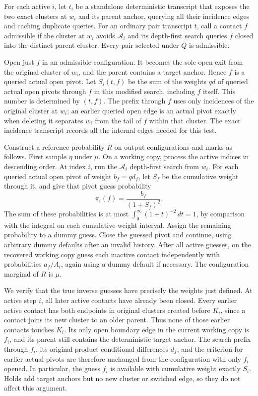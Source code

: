For each active $i$, let $t_i$ be a standalone deterministic transcript
that exposes the two exact clusters at $w_i$ and its parent anchor,
querying all their incidence edges and caching duplicate queries.
For an ordinary pair transcript $t$, call a contact $f$ admissible if
the cluster at $w_i$ avoids $\mathcal A_i$ and its depth-first search
queries $f$ closed into the distinct parent cluster. Every pair selected
under $Q$ is admissible.

Open just $f$ in an admissible configuration. It becomes the sole open
exit from the original cluster of $w_i$, and the parent contains a target
anchor. Hence $f$ is a queried actual open pivot. Let $S_i(t,f)$ be the
sum of the weights $qd$ of queried actual open pivots through $f$ in this
modified search, including $f$ itself. This number is determined by
$(t,f)$. The prefix through $f$ uses only incidences of the original
cluster at $w_i$; an earlier queried open edge is an actual pivot exactly
when deleting it separates $w_i$ from the tail of $f$ within that cluster.
The exact incidence transcript records all the internal edges needed for
this test.

Construct a reference probability $R$ on output configurations and marks
as follows. First sample $\eta$ under $\mu$. On a working copy, process
the active indices in descending order. At index $i$, run the
$\mathcal A_i$ depth-first search from $w_i$. For each queried actual open
pivot of weight $b_f=qd_f$, let $S_f$ be the cumulative weight through it,
and give that pivot guess probability
\begin{equation}\label{eq:interpolation-inverse-guess}
 \pi_i(f)=\frac{b_f}{(1+S_f)^2}.
\end{equation}
The sum of these probabilities is at most
$\int_0^\infty(1+t)^{-2}\,dt=1$, by comparison with the integral on
each cumulative-weight interval. Assign the remaining probability to
a dummy guess. Close the guessed pivot and continue, using arbitrary
dummy defaults after an invalid history. After all active guesses, on
the recovered working copy guess each inactive contact independently
with probabilities $a_f/A_i$, again using a dummy default if necessary.
The configuration marginal of $R$ is $\mu$.

We verify that the true inverse guesses have precisely the weights just
defined. At active step $i$, all later active contacts have already been
closed. Every earlier active contact has both endpoints in original
clusters created before $K_i$, since a contact joins its new cluster to
an older parent. Thus none of those earlier contacts touches $K_i$.
Its only open boundary edge in the current working copy is $f_i$, and
its parent still contains the deterministic target anchor. The search
prefix through $f_i$, its original-product conditional differences
$d_f$, and the criterion for earlier actual pivots are therefore unchanged
from the configuration with only $f_i$ opened. In particular, the guess
$f_i$ is available with cumulative weight exactly $S_i$. Holds add target
anchors but no new cluster or switched edge, so they do not affect this
argument.

